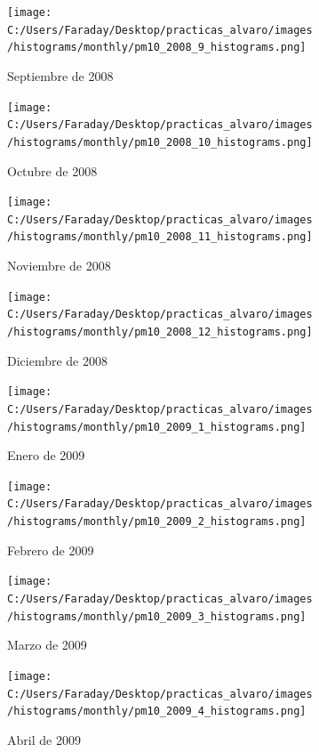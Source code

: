 \documentclass[12pt]{article}
\begin{document}
\begin{figure}[H]
\centering
\begin{subfigure}[h]{0.45\textwidth}
\texttt{[image: C:/Users/Faraday/Desktop/practicas\_alvaro/images/histograms/monthly/pm10\_2008\_9\_histograms.png]}
\caption{Septiembre de 2008}
\label{fig:hist-mon-3-9-2008}
\end{subfigure}
%
\begin{subfigure}[H]{0.45\textwidth}
\texttt{[image: C:/Users/Faraday/Desktop/practicas\_alvaro/images/histograms/monthly/pm10\_2008\_10\_histograms.png]}
\caption{Octubre de 2008}
\label{fig:hist-mon-3-10-2008}
\end{subfigure}
\caption{}
\end{figure}

\begin{figure}[H]
\centering
\begin{subfigure}[h]{0.45\textwidth}
\texttt{[image: C:/Users/Faraday/Desktop/practicas\_alvaro/images/histograms/monthly/pm10\_2008\_11\_histograms.png]}
\caption{Noviembre de 2008}
\label{fig:hist-mon-3-11-2008}
\end{subfigure}
%
\begin{subfigure}[H]{0.45\textwidth}
\texttt{[image: C:/Users/Faraday/Desktop/practicas\_alvaro/images/histograms/monthly/pm10\_2008\_12\_histograms.png]}
\caption{Diciembre de 2008}
\label{fig:hist-mon-3-12-2008}
\end{subfigure}
\caption{}
\end{figure}

\newpage

\begin{figure}[H]
\centering
\begin{subfigure}[h]{0.45\textwidth}
\texttt{[image: C:/Users/Faraday/Desktop/practicas\_alvaro/images/histograms/monthly/pm10\_2009\_1\_histograms.png]}
\caption{Enero de 2009}
\label{fig:hist-mon-3-1-2009}
\end{subfigure}
%
\begin{subfigure}[H]{0.45\textwidth}
\texttt{[image: C:/Users/Faraday/Desktop/practicas\_alvaro/images/histograms/monthly/pm10\_2009\_2\_histograms.png]}
\caption{Febrero de 2009}
\label{fig:hist-mon-3-2-2009}
\end{subfigure}
\caption{}
\end{figure}

\begin{figure}[H]
\centering
\begin{subfigure}[h]{0.45\textwidth}
\texttt{[image: C:/Users/Faraday/Desktop/practicas\_alvaro/images/histograms/monthly/pm10\_2009\_3\_histograms.png]}
\caption{Marzo de 2009}
\label{fig:hist-mon-3-3-2009}
\end{subfigure}
%
\begin{subfigure}[H]{0.45\textwidth}
\texttt{[image: C:/Users/Faraday/Desktop/practicas\_alvaro/images/histograms/monthly/pm10\_2009\_4\_histograms.png]}
\caption{Abril de 2009}
\label{fig:hist-mon-3-4-2009}
\end{subfigure}
\caption{}
\end{figure}
\end{document}
